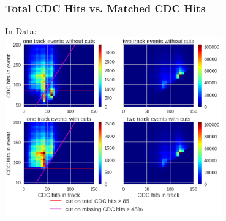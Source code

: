 \documentclass[18pt]{beamer}
\begin{document}
  \begin{frame}
    \frametitle{Total CDC Hits vs. Matched CDC Hits}
    \large In Data:\\
    \includegraphics[width=0.7\textwidth]{figures/hitcontent_2dhist_data.png}
  \end{frame}
\end{document}
